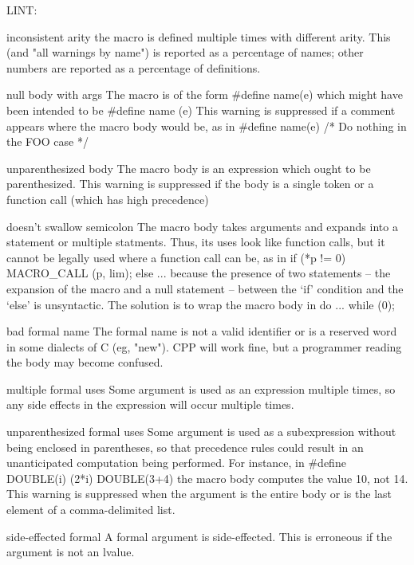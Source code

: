 LINT:

inconsistent arity
        the macro is defined multiple times with different arity.
        This (and "all warnings by name") is reported as a percentage of
        names; other numbers are reported as a percentage of definitions.

null body with args
        The macro is of the form
                #define name(e)
        which might have been intended to be
                #define name (e)
        This warning is suppressed if a comment appears where the macro
        body would be, as in
                #define name(e)         /* Do nothing in the FOO case */

unparenthesized body
        The macro body is an expression which ought to be parenthesized.
        This warning is suppressed if the body is a single token or a
        function call (which has high precedence)

doesn't swallow semicolon
        The macro body takes arguments and expands into a statement or
        multiple statments.  Thus, its uses look like function calls, but
        it cannot be legally used where a function call can be, as in
             if (*p != 0)
               MACRO_CALL (p, lim);
             else ...
        because the presence of two statements -- the expansion of the macro and
        a null statement -- between the `if' condition and the `else'
        is unsyntactic.  The solution is to wrap the macro body in
             do {...} while (0);

bad formal name
        The formal name is not a valid identifier or is a reserved word in
        some dialects of C (eg, "new").  CPP will work fine, but a
        programmer reading the body may become confused.

multiple formal uses
        Some argument is used as an expression multiple times, so any side
        effects in the expression will occur multiple times.

unparenthesized formal uses
        Some argument is used as a subexpression without being enclosed in
        parentheses, so that precedence rules could result in an
        unanticipated computation being performed.  For instance, in
                #define DOUBLE(i) (2*i)
                DOUBLE(3+4)
        the macro body computes the value 10, not 14.
        This warning is suppressed when the argument is the entire body
        or is the last element of a comma-delimited list.

side-effected formal
        A formal argument is side-effected.  This is erroneous if the
        argument is not an lvalue.

